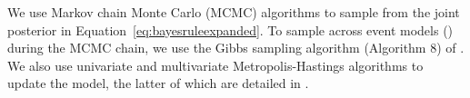 We use Markov chain Monte Carlo (MCMC) algorithms to sample from the joint
posterior in Equation~\ref{eq:bayesruleexpanded}.
To sample across event models (\etimesets) during the MCMC chain, we use the
Gibbs sampling algorithm (Algorithm 8) of \citet{Neal2000}.
We also use univariate and multivariate Metropolis-Hastings algorithms
\citep{Metropolis1953,Hastings1970} to update the model,
the latter of which are detailed in \citet{Oaks2018ecoevolity}.


